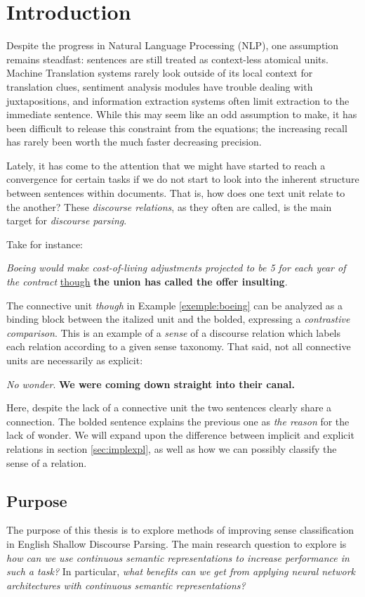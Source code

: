 \chapter{Introduction}

Despite the progress in Natural Language Processing (NLP), one assumption remains steadfast: sentences are still treated as context-less atomical units. Machine Translation systems rarely look outside of its local context for translation clues, sentiment analysis modules have trouble dealing with juxtapositions, and information extraction systems often limit extraction to the immediate sentence. While this may seem like an odd assumption to make, it has been difficult to release this constraint from the equations; the increasing recall has rarely been worth the much faster decreasing precision.

Lately, it has come to the attention that we might have started to reach a convergence for certain tasks if we do not start to look into the inherent structure between sentences within documents. That is, how does one text unit relate to the another? These \emph{discourse relations}, as they often are called, is the main target for \emph{discourse parsing}.

Take for instance:

\begin{exe}
\ex \emph{Boeing would make cost-of-living adjustments projected to be 5 for each year of the contract} \underline{though} \textbf{the union has called the offer insulting}.\label{exemple:boeing}
\end{exe}

The connective unit \emph{though} in Example \ref{exemple:boeing} can be analyzed as a binding block between the italized unit and the bolded, expressing a \emph{contrastive comparison}. This is an example of a \emph{sense} of a discourse relation which labels each relation according to a given sense taxonomy. That said, not all connective units are necessarily as explicit:

\begin{exe}
\ex \emph{No wonder}. \textbf{We were coming down straight into their canal.}\label{exemple:nowonder}
\end{exe}

Here, despite the lack of a connective unit the two sentences clearly share a connection. The bolded sentence explains the previous one as \emph{the reason} for the lack of wonder. We will expand upon the difference between implicit and explicit relations in section \ref{sec:implexpl}, as well as how we can possibly classify the sense of a relation.


\section{Purpose}

The purpose of this thesis is to explore methods of improving sense classification in English Shallow Discourse Parsing. The main research question to explore is \emph{how can we use continuous semantic representations to increase performance in such a task?} In particular, \emph{what benefits can we get from applying neural network architectures with continuous semantic representations?}
